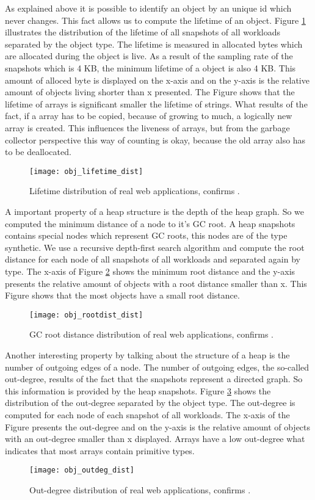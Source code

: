 As explained above it is possible to identify an object by an unique id which never changes. This fact allows us to compute the lifetime of an object. Figure \ref{fig:obj_lifetime_dist} illustrates the distribution of the lifetime of all snapshots of all workloads separated by the object type. The lifetime is measured in allocated bytes which are allocated during the object is live. As a result of the sampling rate of the snapshots which is 4 KB, the minimum lifetime of a object is also 4 KB. This amount of alloced byte is displayed on the x-axis and on the y-axis is the relative amount of objects living shorter than x presented. The Figure shows that the lifetime of arrays is significant smaller the lifetime of strings. What results of the fact, if a array has to be copied, because of growing to much, a logically new array is created. This influences the liveness of arrays, but from the garbage collector perspective this way of counting is okay, because the old array also has to be deallocated.
\begin{figure}
	\centering
	\texttt{[image: obj\_lifetime\_dist]}
	\caption{Lifetime distribution of real web applications, confirms \cite{JSMeter2009}.}
	\label{fig:obj_lifetime_dist}
\end{figure}

A important property of a heap structure is the depth of the heap graph. So we computed the minimum distance of a node to it's GC root. A heap snapshots contains special nodes which represent GC roots, this nodes are of the type synthetic. We use a recursive depth-first search algorithm and compute the root distance for each node of all snapshots of all workloads and separated again by type. The x-axis of Figure \ref{fig:obj_rootdist_dist} shows the minimum root distance and the y-axis presents the relative amount of objects with a root distance smaller than x. This Figure shows that the most objects have a small root distance.
\begin{figure}
	\centering
	\texttt{[image: obj\_rootdist\_dist]}
	\caption{GC root distance distribution of real web applications, confirms \cite{JSMeter2009}.}
	\label{fig:obj_rootdist_dist}
\end{figure}

Another interesting property by talking about the structure of a heap is the number of outgoing edges of a node. The number of outgoing edges, the so-called out-degree, results of the fact that the snapshots represent a directed graph. So this information is provided by the heap snapshots. Figure \ref{fig:obj_outdeg_dist} shows the distribution of the out-degree separated by the object type. The out-degree is computed for each node of each snapshot of all workloads. The x-axis of the Figure presents the out-degree and on the y-axis is the relative amount of objects with an out-degree smaller than x displayed. Arrays have a low out-degree what indicates that most arrays contain primitive types. 
\begin{figure}
	\centering
	\texttt{[image: obj\_outdeg\_dist]}
	\caption{Out-degree distribution of real web applications, confirms \cite{JSMeter2009}.}
	\label{fig:obj_outdeg_dist}
\end{figure}

